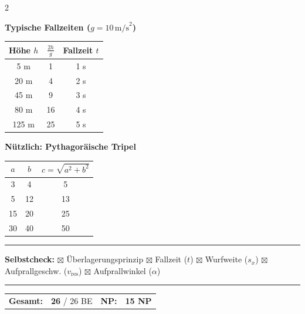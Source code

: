 \documentclass[10pt, a4paper]{article}
\newcommand{\fachfarbe}{physik}
\newcommand{\gesamt}{26}
\newcommand{\lsg}[1]{\textcolor{loesung}{\textbf{#1}}}
\newcommand{\abschnitt}[1]{%
    \vspace{4pt}
    \noindent\textbf{\textcolor{\fachfarbe}{#1}}
    \vspace{2pt}
}
\begin{document}
\begin{multicols}{2}
\columnbreak


\abschnitt{Typische Fallzeiten ($g = 10\,\text{m/s}^2$)}

\begin{center}
\begin{tabular}{|c|c|c|}
\hline
\textbf{Höhe $h$} & \textbf{$\frac{2h}{g}$} & \textbf{Fallzeit $t$} \\
\hline
5 m & 1 & 1 s \\
\hline
20 m & 4 & 2 s \\
\hline
45 m & 9 & 3 s \\
\hline
80 m & 16 & 4 s \\
\hline
125 m & 25 & 5 s \\
\hline
\end{tabular}
\end{center}

\vspace{4pt}


\abschnitt{Nützlich: Pythagoräische Tripel}

\begin{center}
\begin{tabular}{|c|c|c|}
\hline
$a$ & $b$ & $c = \sqrt{a^2 + b^2}$ \\
\hline
3 & 4 & 5 \\
\hline
5 & 12 & 13 \\
\hline
15 & 20 & 25 \\
\hline
30 & 40 & 50 \\
\hline
\end{tabular}
\end{center}

\end{multicols}


\vspace{-2pt}
\hrule
\vspace{3pt}

\small
\textbf{Selbstcheck:} \hfill
$\boxtimes$ Überlagerungsprinzip \quad
$\boxtimes$ Fallzeit ($t$) \quad
$\boxtimes$ Wurfweite ($s_x$) \quad
$\boxtimes$ Aufprallgeschw. ($v_{\text{res}}$) \quad
$\boxtimes$ Aufprallwinkel ($\alpha$)

\vspace{3pt}
\hrule
\vspace{3pt}

\begin{tabular}{llll}
\textbf{Gesamt:} & \lsg{26} / \gesamt{} BE &
\textbf{NP:} & \lsg{15 NP}
\end{tabular}
\end{document}
